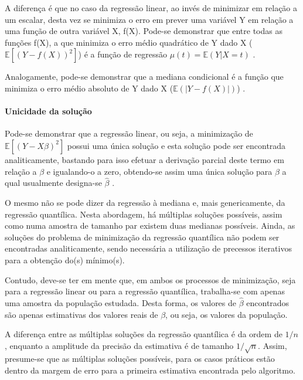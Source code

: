 \documentclass[a4paper, 12pt]{article}
\let\oldparagraph\paragraph
\renewcommand{\paragraph}[1]{\oldparagraph{#1}\mbox{}}
\begin{document}
A diferença é que no caso da regressão linear, ao invés de minimizar em
relação a um escalar, desta vez se minimiza o erro em prever uma
variável Y em relação a uma função de outra variável X, f(X). Pode-se
demonstrar que entre todas as funções f(X), a que minimiza o erro médio
quadrático de Y dado X (\(\mathbb{E}[(Y - f(X))^2]\)) é a função de
regressão \(\mu(t) = \mathbb{E}(Y|X=t)\) \autocite[49-50]{matloff2017}.

Analogamente, pode-se demonstrar que a mediana condicional é a função
que minimiza o erro médio absoluto de Y dado X
(\(\mathbb{E}(|Y-f(X)|)\)) \autocite[260-261]{matloff2017}.

\hypertarget{unicidade-da-solucao}{%
\paragraph{Unicidade da solução}\label{unicidade-da-solucao}}

Pode-se demonstrar que a regressão linear, ou seja, a minimização de
\(\mathbb{E}[(Y - X\beta)^2]\) possui uma única solução e esta solução
pode ser encontrada analiticamente, bastando para isso efetuar a
derivação parcial deste termo em relação a \(\beta\) e igualando-o a
zero, obtendo-se assim uma única solução para \(\beta\) a qual
usualmente designa-se \(\hat \beta\) \autocite[ver][49-50]{matloff2017}.

O mesmo não se pode dizer da regressão à mediana e, mais genericamente,
da regressão quantílica. Nesta abordagem, há múltiplas soluções
possíveis, assim como numa amostra de tamanho par existem duas medianas
possíveis. Ainda, as soluções do problema de minimização da regressão
quantílica não podem ser encontradas analiticamente, sendo necessária a
utilização de precessos iterativos para a obtenção do(s) mínimo(s).

Contudo, deve-se ter em mente que, em ambos os processos de minimização,
seja para a regressão linear ou para a regressão quantílica, trabalha-se
com apenas uma amostra da população estudada. Desta forma, os valores de
\(\hat \beta\) encontrados são apenas estimativas dos valores reais de
\(\beta\), ou seja, os valores da população.

A diferença entre as múltiplas soluções da regressão quantílica é da
ordem de \(1/n\), enquanto a amplitude da precisão da estimativa é de
tamanho \(1/\sqrt{n}\). Assim, presume-se que as múltiplas soluções
possíveis, para os casos práticos estão dentro da margem de erro para a
primeira estimativa encontrada pelo algoritmo.
\end{document}
